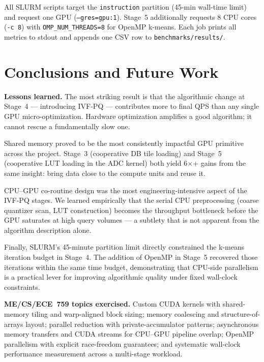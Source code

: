 \documentclass[12pt]{article}
\begin{document}
All SLURM scripts target the \texttt{instruction} partition (45-min wall-time
limit) and request one GPU (\texttt{--gres=gpu:1}).
Stage~5 additionally requests 8 CPU cores (\texttt{-c~8}) with
\texttt{OMP\_NUM\_THREADS=8} for OpenMP k-means.
Each job prints all metrics to stdout and appends one CSV row to
\texttt{benchmarks/results/}.

\section{Conclusions and Future Work}

\textbf{Lessons learned.}
The most striking result is that the algorithmic change at Stage~4 ---
introducing IVF-PQ --- contributes more to final QPS than any single
GPU micro-optimization. Hardware optimization amplifies a good algorithm;
it cannot rescue a fundamentally slow one.

Shared memory proved to be the most consistently impactful GPU primitive
across the project. Stage~3 (cooperative DB tile loading) and Stage~5
(cooperative LUT loading in the ADC kernel) both yield 6$\times$+ gains
from the same insight: bring data close to the compute units and reuse it.

CPU--GPU co-routine design was the most engineering-intensive aspect of the
IVF-PQ stages. We learned empirically that the serial CPU preprocessing
(coarse quantizer scan, LUT construction) becomes the throughput bottleneck
before the GPU saturates at high query volumes --- a subtlety that is not
apparent from the algorithm description alone.

Finally, SLURM's 45-minute partition limit directly constrained the
k-means iteration budget in Stage~4.
The addition of OpenMP in Stage~5 recovered those iterations within the same
time budget, demonstrating that CPU-side parallelism is a practical lever
for improving algorithmic quality under fixed wall-clock constraints.

\textbf{ME/CS/ECE~759 topics exercised.}
Custom CUDA kernels with shared-memory tiling and warp-aligned block sizing;
memory coalescing and structure-of-arrays layout; parallel reduction with
private-accumulator patterns; asynchronous memory transfers and CUDA streams
for CPU--GPU pipeline overlap; OpenMP parallelism with explicit race-freedom
guarantees; and systematic wall-clock performance measurement across a
multi-stage workload.
\end{document}
